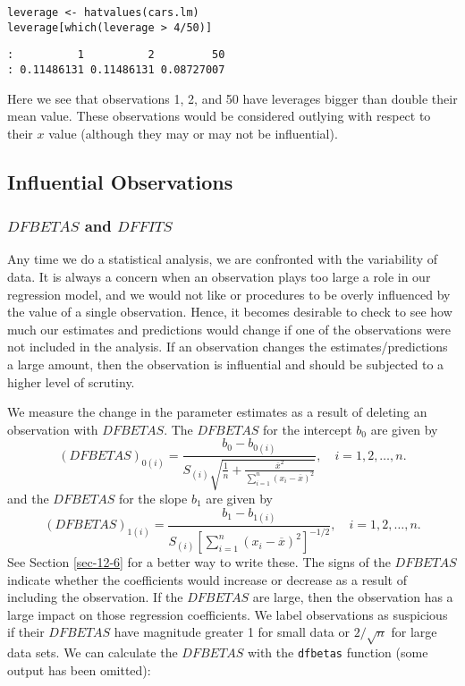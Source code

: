 \begin{verbatim}
leverage <- hatvalues(cars.lm)
leverage[which(leverage > 4/50)]
\end{verbatim}

\begin{verbatim}
:          1          2         50 
: 0.11486131 0.11486131 0.08727007
\end{verbatim}

Here we see that observations 1, 2, and 50 have leverages bigger than
double their mean value. These observations would be considered
outlying with respect to their \(x\) value (although they may or may
not be influential).

\subsection{Influential Observations}
\label{sec-11-5-4}

\subsubsection{\(DFBETAS\) and \(DFFITS\)}
\label{sec-11-5-4-1}

Any time we do a statistical analysis, we are confronted with the
variability of data. It is always a concern when an observation plays
too large a role in our regression model, and we would not like or
procedures to be overly influenced by the value of a single
observation. Hence, it becomes desirable to check to see how much our
estimates and predictions would change if one of the observations were
not included in the analysis. If an observation changes the
estimates/predictions a large amount, then the observation is
influential and should be subjected to a higher level of scrutiny.

We measure the change in the parameter estimates as a result of
deleting an observation with \(DFBETAS\). The \(DFBETAS\) for the
intercept \(b_{0}\) are given by
\begin{equation}
(DFBETAS)_{0(i)}=\frac{b_{0}-b_{0(i)}}{S_{(i)}\sqrt{\frac{1}{n}+\frac{\overline{x}^{2}}{\sum_{i=1}^{n}(x_{i}-\overline{x})^{2}}}},\quad i=1,2,\ldots,n.
\end{equation}
and the \(DFBETAS\) for the slope \(b_{1}\) are given by
\begin{equation}
(DFBETAS)_{1(i)}=\frac{b_{1}-b_{1(i)}}{S_{(i)}\left[\sum_{i=1}^{n}(x_{i}-\overline{x})^{2}\right]^{-1/2}},\quad i=1,2,\ldots,n.
\end{equation}
See Section \ref{sec-12-6} for a better way to write these. The
signs of the \(DFBETAS\) indicate whether the coefficients would
increase or decrease as a result of including the observation. If the
\(DFBETAS\) are large, then the observation has a large impact on
those regression coefficients. We label observations as suspicious if
their \(DFBETAS\) have magnitude greater 1 for small data or
\(2/\sqrt{n}\) for large data sets.  We can calculate the \(DFBETAS\)
with the \texttt{dfbetas} function (some output has been omitted):

